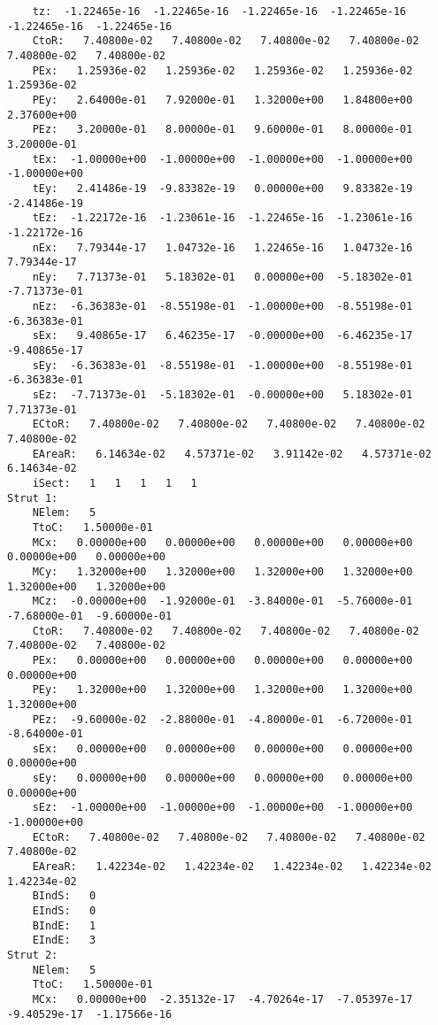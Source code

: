 \begin{lstlisting}
    tz:  -1.22465e-16  -1.22465e-16  -1.22465e-16  -1.22465e-16  -1.22465e-16  -1.22465e-16 
    CtoR:   7.40800e-02   7.40800e-02   7.40800e-02   7.40800e-02   7.40800e-02   7.40800e-02 
    PEx:   1.25936e-02   1.25936e-02   1.25936e-02   1.25936e-02   1.25936e-02 
    PEy:   2.64000e-01   7.92000e-01   1.32000e+00   1.84800e+00   2.37600e+00 
    PEz:   3.20000e-01   8.00000e-01   9.60000e-01   8.00000e-01   3.20000e-01 
    tEx:  -1.00000e+00  -1.00000e+00  -1.00000e+00  -1.00000e+00  -1.00000e+00 
    tEy:   2.41486e-19  -9.83382e-19   0.00000e+00   9.83382e-19  -2.41486e-19 
    tEz:  -1.22172e-16  -1.23061e-16  -1.22465e-16  -1.23061e-16  -1.22172e-16 
    nEx:   7.79344e-17   1.04732e-16   1.22465e-16   1.04732e-16   7.79344e-17 
    nEy:   7.71373e-01   5.18302e-01   0.00000e+00  -5.18302e-01  -7.71373e-01 
    nEz:  -6.36383e-01  -8.55198e-01  -1.00000e+00  -8.55198e-01  -6.36383e-01 
    sEx:   9.40865e-17   6.46235e-17  -0.00000e+00  -6.46235e-17  -9.40865e-17 
    sEy:  -6.36383e-01  -8.55198e-01  -1.00000e+00  -8.55198e-01  -6.36383e-01 
    sEz:  -7.71373e-01  -5.18302e-01  -0.00000e+00   5.18302e-01   7.71373e-01 
    ECtoR:   7.40800e-02   7.40800e-02   7.40800e-02   7.40800e-02   7.40800e-02 
    EAreaR:   6.14634e-02   4.57371e-02   3.91142e-02   4.57371e-02   6.14634e-02 
    iSect:   1   1   1   1   1 
Strut 1: 
    NElem:   5 
    TtoC:   1.50000e-01 
    MCx:   0.00000e+00   0.00000e+00   0.00000e+00   0.00000e+00   0.00000e+00   0.00000e+00 
    MCy:   1.32000e+00   1.32000e+00   1.32000e+00   1.32000e+00   1.32000e+00   1.32000e+00 
    MCz:  -0.00000e+00  -1.92000e-01  -3.84000e-01  -5.76000e-01  -7.68000e-01  -9.60000e-01 
    CtoR:   7.40800e-02   7.40800e-02   7.40800e-02   7.40800e-02   7.40800e-02   7.40800e-02 
    PEx:   0.00000e+00   0.00000e+00   0.00000e+00   0.00000e+00   0.00000e+00 
    PEy:   1.32000e+00   1.32000e+00   1.32000e+00   1.32000e+00   1.32000e+00 
    PEz:  -9.60000e-02  -2.88000e-01  -4.80000e-01  -6.72000e-01  -8.64000e-01 
    sEx:   0.00000e+00   0.00000e+00   0.00000e+00   0.00000e+00   0.00000e+00 
    sEy:   0.00000e+00   0.00000e+00   0.00000e+00   0.00000e+00   0.00000e+00 
    sEz:  -1.00000e+00  -1.00000e+00  -1.00000e+00  -1.00000e+00  -1.00000e+00 
    ECtoR:   7.40800e-02   7.40800e-02   7.40800e-02   7.40800e-02   7.40800e-02 
    EAreaR:   1.42234e-02   1.42234e-02   1.42234e-02   1.42234e-02   1.42234e-02 
    BIndS:   0 
    EIndS:   0 
    BIndE:   1 
    EIndE:   3 
Strut 2: 
    NElem:   5 
    TtoC:   1.50000e-01 
    MCx:   0.00000e+00  -2.35132e-17  -4.70264e-17  -7.05397e-17  -9.40529e-17  -1.17566e-16 

\end{lstlisting}
